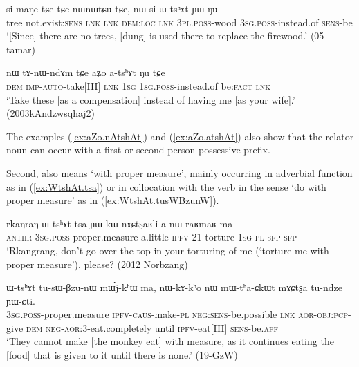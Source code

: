 \begin{exe}
\ex \label{ex:nWsi.WtshAt}
\gll si maŋe tɕe tɕe nɯnɯtɕu tɕe, nɯ-si ɯ-tsʰɤt ɲɯ-ŋu  \\
tree not.exist:\textsc{sens} \textsc{lnk} \textsc{lnk} \textsc{dem}:\textsc{loc} \textsc{lnk} \textsc{3pl}.\textsc{poss}-wood \textsc{3sg}.\textsc{poss}-instead.of \textsc{sens}-be \\
\glt `[Since] there are no trees, [dung] is used there to replace the firewood.' (05-tamar)
\end{exe}


\begin{exe}
\ex \label{ex:aZo.atshAt}
\gll nɯ tɤ-nɯ-ndɤm tɕe aʑo a-tsʰɤt ŋu tɕe \\
\textsc{dem} \textsc{imp}-\textsc{auto}-take[III] \textsc{lnk} \textsc{1sg} \textsc{1sg}.\textsc{poss}-instead.of be:\textsc{fact} \textsc{lnk} \\
\glt `Take these [as a compensation] instead of having me [as your wife].' (2003kAndzwsqhaj2)
\end{exe}

The examples (\ref{ex:aZo.nAtshAt}) and (\ref{ex:aZo.atshAt}) also show that the relator noun  can occur with a first or second person possessive prefix.

Second,  also means `with proper measure', mainly occurring in adverbial function as in (\ref{ex:WtshAt.tsa}) or in collocation with the verb  in the sense `do with proper measure' as in (\ref{ex:WtshAt.tusWBzunW}). 

\begin{exe}
\ex \label{ex:WtshAt.tsa}
\gll rkaŋraŋ ɯ-tsʰɤt tsa ɲɯ-kɯ-nɤɕtʂaʁli-a-nɯ raʁmaʁ ma  \\
\textsc{anthr} \textsc{3sg}.\textsc{poss}-proper.measure a.little \textsc{ipfv}-2\fl{}1-torture-\textsc{1sg}-\textsc{pl} \textsc{sfp} \textsc{sfp}  \\
\glt `Rkangrang, don't go over the top in your torturing of me (`torture me with proper measure'), please? (2012 Norbzang)
\end{exe}

\begin{exe}
\ex \label{ex:WtshAt.tusWBzunW}
\gll ɯ-tsʰɤt tu-sɯ-βzu-nɯ mɯ́j-kʰɯ ma, nɯ-kɤ-kʰo nɯ mɯ-tʰa-ɕkɯt mɤɕtʂa tu-ndze ɲɯ-ɕti. \\
\textsc{3sg}.\textsc{poss}-proper.measure \textsc{ipfv}-\textsc{caus}-make-\textsc{pl} \textsc{neg}:\textsc{sens}-be.possible \textsc{lnk}  \textsc{aor}-\textsc{obj}:\textsc{pcp}-give \textsc{dem} \textsc{neg}-\textsc{aor}:3\flobv{}-eat.completely until \textsc{ipfv}-eat[III] \textsc{sens}-be.\textsc{aff} \\
\glt `They cannot make [the monkey eat] with measure, as it continues eating the [food] that is given to it until there is none.' (19-GzW)
\end{exe}

